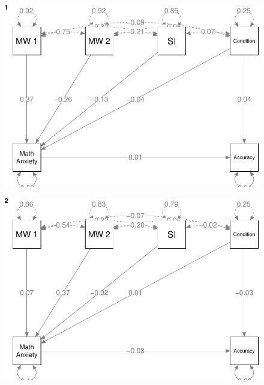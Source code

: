 \documentclass[
  letterpaper,
  DIV=11,
  numbers=noendperiod]{scrartcl}
\begin{document}
\begin{figure}[H]

{\centering \includegraphics{sampling_files/figure-pdf/unnamed-chunk-33-1.pdf}

}

\end{figure}

\begin{figure}[H]

{\centering \includegraphics{sampling_files/figure-pdf/unnamed-chunk-33-2.pdf}

}

\end{figure}
\end{document}
